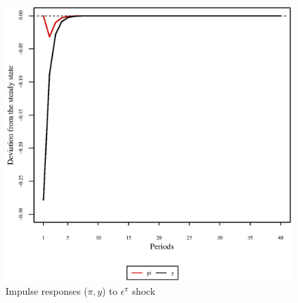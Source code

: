 \begin{figure}[h]
\centering
\begin{minipage}{0.5\textwidth}
\vspace*{-3em}
\centering
\includegraphics[width=0.99\textwidth, scale=0.55]{plots/plot_33.eps}
\caption{Impulse responses ($\pi, y$) to $\epsilon^{\pi}$ shock}
\end{minipage}
\end{figure}
